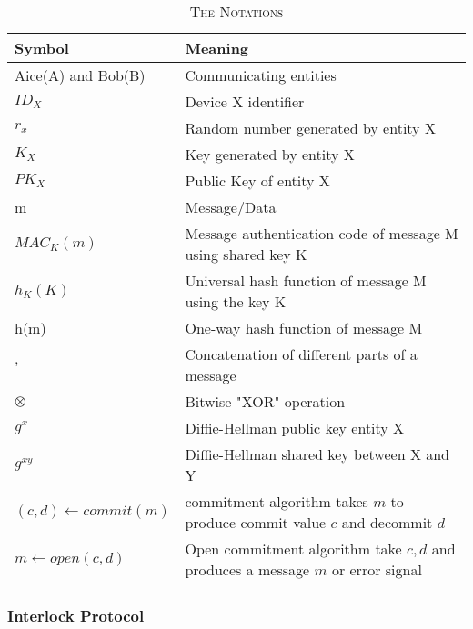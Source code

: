 \begin{table}[ht] 
\centering
\caption{\textsc{The Notations}}
\label{notation}
{\scriptsize
\begin{tabular}{|p{5cm} | p{10cm} |}
\hline
\textbf{Symbol} & \textbf{Meaning} \\ \hline 
Aice(A) and Bob(B) & Communicating entities \\ 
$ID_X$ & Device X identifier \\ 
$r_x$ & Random number generated by entity X \\
$K_X$ & Key generated by entity X \\
$PK_X$ & Public Key of entity X \\ 
m & Message/Data \\ 
$MAC_K(m)$ & Message authentication code of message M using shared key K \\ 
$h_K(K)$ & Universal hash function of message M using the key K \\ 
h(m) & One-way hash function of message M \\ 
$,$ & Concatenation of different parts of a message\\ 
$\otimes$ & Bitwise "XOR" operation \\ 
$g^x$ & Diffie-Hellman public key entity X \\ 
$g^{xy}$ & Diffie-Hellman shared key between X and Y \\ 
$(c,d) \leftarrow commit(m)$ & commitment algorithm takes $m$ to produce commit value $c$ and decommit $d$ \\ 
$m \leftarrow open(c,d)$ & Open commitment algorithm take $c,d$ and produces a message $m$ or error signal \\ \hline 

\end{tabular}
}
\end{table}

\subsubsection{Interlock Protocol}

